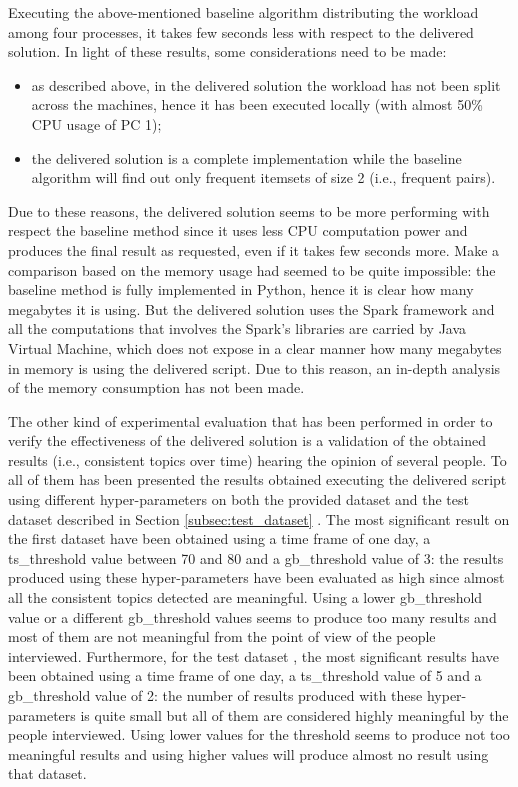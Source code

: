 Executing the above-mentioned baseline algorithm distributing the workload among four processes, it takes few seconds less with respect to the delivered solution. In light of these results, some considerations need to be made:
\begin{itemize}
	\item as described above, in the delivered solution the workload has not been split across the machines, hence it has been executed locally (with almost 50\% CPU usage of PC 1);
	\item the delivered solution is a complete implementation while the baseline algorithm will find out only frequent itemsets of size 2 (i.e., frequent pairs).
\end{itemize}
Due to these reasons, the delivered solution seems to be more performing with respect the baseline method since it uses less CPU computation power and produces the final result as requested, even if it takes few seconds more. Make a comparison based on the memory usage had seemed to be quite impossible: the baseline method is fully implemented in Python, hence it is clear how many megabytes it is using. But the delivered solution uses the Spark framework and all the computations that involves the Spark's libraries are carried by Java Virtual Machine, which does not expose in a clear manner how many megabytes in memory is using the delivered script. Due to this reason, an in-depth analysis of the memory consumption has not been made.

The other kind of experimental evaluation that has been performed in order to verify the effectiveness of the delivered solution is a validation of the obtained results (i.e., consistent topics over time) hearing the opinion of several people. To all of them has been presented the results obtained executing the delivered script using different hyper-parameters on both the provided dataset \cite{covid19-tweets-dataset} and the test dataset described in Section \ref{subsec:test_dataset} \cite{sentiment-analysis-dataset}. The most significant result on the first dataset have been obtained using a time frame of one day, a ts\_threshold value between 70 and 80 and a gb\_threshold value of 3: the results produced using these hyper-parameters have been evaluated as high since almost all the consistent topics detected are meaningful. Using a lower gb\_threshold value or a different gb\_threshold values seems to produce too many results and most of them are not meaningful from the point of view of the people interviewed. Furthermore, for the test dataset \cite{sentiment-analysis-dataset}, the most significant results have been obtained using a time frame of one day, a ts\_threshold value of 5 and a gb\_threshold value of 2: the number of results produced with these hyper-parameters is quite small but all of them are considered highly meaningful by the people interviewed. Using lower values for the threshold seems to produce not too meaningful results and using higher values will produce almost no result using that dataset.

